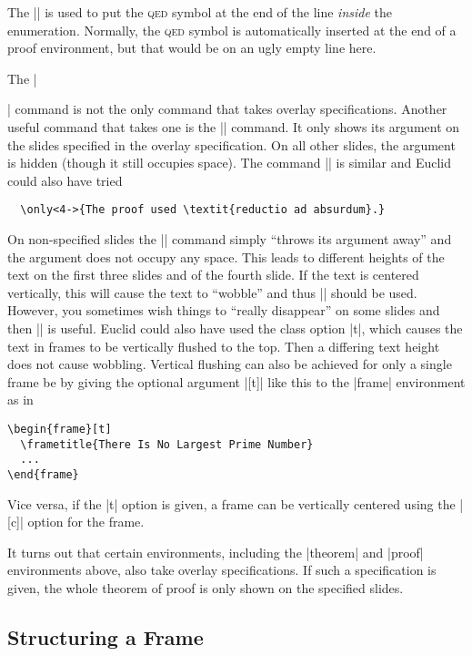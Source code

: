 The |\qedhere| is used to put the \textsc{qed} symbol at the end of
the line \emph{inside} the enumeration. Normally, the \textsc{qed}
symbol is automatically inserted at the end of a proof environment,
but that would be on an ugly empty line here.

The |\item| command is not the only command that takes overlay
specifications. Another useful command that takes one is the
|\uncover| command. It only shows its argument on the slides specified 
in the overlay specification. On all other slides, the argument is
hidden (though it still occupies space). The command |\only| is
similar and Euclid could also have tried
\begin{verbatim}
  \only<4->{The proof used \textit{reductio ad absurdum}.}
\end{verbatim}
On non-specified slides the |\only| command simply ``throws its
argument away'' and the argument does not occupy any space. This leads
to different heights of the text on the first three slides and of the
fourth slide. If the text is centered vertically, this will cause the
text to ``wobble'' and thus |\uncover| should be used. However, you
sometimes wish things to ``really disappear'' on some slides and then
|\only| is useful. Euclid could also have used the class option
|t|, which causes the text in frames to be vertically flushed
to the top. Then a differing text height does not cause
wobbling. Vertical flushing can also be achieved for only a single
frame be by giving the optional argument |[t]| like this to the
|frame| environment as in 
\begin{verbatim}
\begin{frame}[t]
  \frametitle{There Is No Largest Prime Number}
  ...
\end{frame}
\end{verbatim}
Vice versa, if the |t| option is given, a frame can be
vertically centered using the |[c]| option for the frame.

It turns out that certain environments, including the |theorem| and
|proof| environments above, also take overlay specifications. If such
a specification is given, the whole theorem of proof is only shown on
the specified slides.


\subsection{Structuring a Frame}

